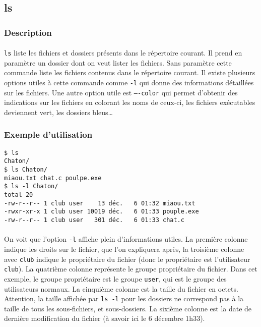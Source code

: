 \subsection{ls}
\subsubsection*{Description}

\paragraph{} \texttt{ls} liste les fichiers et dossiers présents dans le
répertoire courant. Il prend en paramètre un dossier dont on veut lister les
fichiers. Sans paramètre cette commande liste les fichiers contenus dans le
répertoire courant. Il existe plusieurs options utiles à cette commande comme
\texttt{-l} qui donne des informations détaillées sur les fichiers. Une autre
option utile est \texttt{----color} qui permet d'obtenir des indications sur
les fichiers en colorant les noms de ceux-ci, les fichiers exécutables
deviennent vert, les dossiers bleus\ldots

\subsubsection*{Exemple d'utilisation}
\begin{lstlisting}
$ ls
Chaton/
$ ls Chaton/
miaou.txt chat.c poulpe.exe
$ ls -l Chaton/
total 20
-rw-r--r-- 1 club user    13 déc.   6 01:32 miaou.txt
-rwxr-xr-x 1 club user 10019 déc.   6 01:33 pouple.exe
-rw-r--r-- 1 club user   301 déc.   6 01:33 chat.c
\end{lstlisting}

\paragraph{} On voit que l'option \texttt{-l} affiche plein d'informations
utiles. La première colonne indique les droits sur le fichier, que l'on
expliquera après, la troisième colonne avec \texttt{club} indique le
propriétaire du fichier (donc le propriétaire est l'utilisateur \texttt{club}).
La quatrième colonne représente le groupe propriétaire du fichier. Dans cet
exemple, le groupe propriétaire est le groupe \texttt{user}, qui est le groupe
des utilisateurs normaux. La cinquième colonne est la taille du fichier en
octets. Attention, la taille affichée par \texttt{ls -l} pour les dossiers ne
correspond pas à la taille de tous les sous-fichiers, et sous-dossiers. La
sixième colonne est la date de dernière modification du fichier (à savoir ici
le 6 décembre 1h33).

